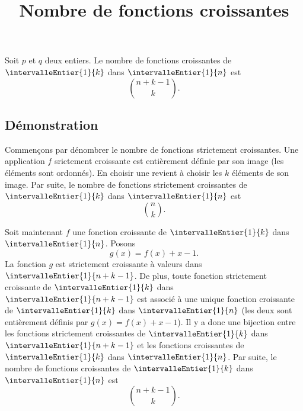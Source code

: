 \documentclass[fontsize=12pt,twoside=false,parskip=half, french]{scrartcl}
\title{Nombre de fonctions croissantes}
\date{}
\author{}
\begin{document}
\maketitle
   \begin{Theoreme}
      Soit $p$ et $q$ deux entiers. Le nombre de fonctions croissantes de $\intervalleEntier{1}{k}$ dans 
      $\intervalleEntier{1}{n}$ est
      \[
         \binom{n + k - 1}{k}.
      \] 
   \end{Theoreme}
   \subsection{Démonstration}
      Commençons par dénombrer le nombre de fonctions strictement croissantes. Une application $f$ srictement
      croissante est entièrement définie par son image (les éléments sont ordonnés). En choisir une revient à
      choisir les $k$ éléments de son image. 
      Par suite, le nombre de fonctions strictement croissantes de $\intervalleEntier{1}{k}$ dans $\intervalleEntier{1}{n}$ est
      \[
         \binom{n}{k}.
      \]
   
      Soit maintenant $f$ une fonction croissante de $\intervalleEntier{1}{k}$ dans $\intervalleEntier{1}{n}$. Posons
      \[
         g(x) = f(x) + x - 1.
      \]
      La fonction $g$ est strictement croissante à valeurs dans $\intervalleEntier{1}{n + k - 1}$. De plus, toute 
      fonction strictement croissante de $\intervalleEntier{1}{k}$ dans $\intervalleEntier{1}{n + k - 1}$ est associé 
      à une unique fonction croissante de $\intervalleEntier{1}{k}$ dans $\intervalleEntier{1}{n}$ (les deux sont 
      entièrement définis par $g(x) = f(x) + x - 1$). Il y a donc une bijection entre les fonctions strictement 
      croissantes de $\intervalleEntier{1}{k}$ dans $\intervalleEntier{1}{n + k - 1}$ et les fonctions croissantes 
      de $\intervalleEntier{1}{k}$ dans $\intervalleEntier{1}{n}$. Par suite, le nombre de fonctions
      croissantes de $\intervalleEntier{1}{k}$ dans $\intervalleEntier{1}{n}$ est
      \[
         \binom{n + k - 1}{k}.
      \]    
\end{document}
